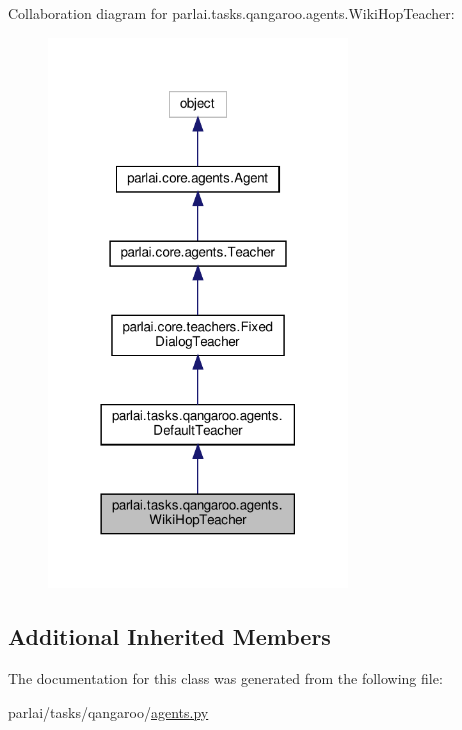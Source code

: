 Collaboration diagram for parlai.\+tasks.\+qangaroo.\+agents.\+Wiki\+Hop\+Teacher\+:
\nopagebreak
\begin{figure}[H]
\begin{center}
\leavevmode
\includegraphics[width=225pt]{classparlai_1_1tasks_1_1qangaroo_1_1agents_1_1WikiHopTeacher__coll__graph}
\end{center}
\end{figure}
\subsection*{Additional Inherited Members}


The documentation for this class was generated from the following file\+:\begin{DoxyCompactItemize}
\item 
parlai/tasks/qangaroo/\hyperlink{parlai_2tasks_2qangaroo_2agents_8py}{agents.\+py}\end{DoxyCompactItemize}
